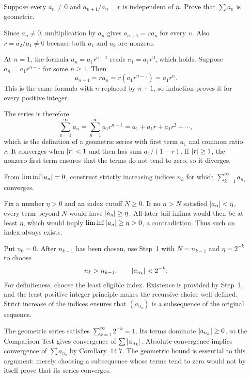 \goal Suppose every $a_n\ne0$ and $a_{n+1}/a_n=r$ is independent
of $n$. Prove that $\sum a_n$ is geometric.

Since $a_n\ne0$, multiplication by $a_n$ gives
$a_{n+1}=ra_n$ for every $n$. Also $r=a_2/a_1\ne0$ because
both $a_1$ and $a_2$ are nonzero.

At $n=1$, the formula $a_n=a_1r^{n-1}$ reads $a_1=a_1r^0$,
which holds. Suppose $a_n=a_1r^{n-1}$ for some $n\ge1$.
Then
\[
 a_{n+1}=ra_n=r(a_1r^{n-1})=a_1r^n.
\]
This is the same formula with $n$ replaced by $n+1$, so induction
proves it for every positive integer.

The series is therefore
\[
 \sum_{n=1}^{\infty}a_n
 =\sum_{n=1}^{\infty}a_1r^{n-1}
 =a_1+a_1r+a_1r^2+\cdots,
\]
which is the definition of a geometric series with first term
$a_1$ and common ratio $r$. It converges when $\left|r\right|<1$ and
then has sum $a_1/(1-r)$. If $\left|r\right|\ge1$, the nonzero first
term ensures that the terms do not tend to zero, so it diverges.

\goal From $\liminf\left|a_n\right|=0$, construct strictly increasing
indices $n_k$ for which $\sum_{k=1}^{\infty}a_{n_k}$ converges.

Fix a number $\eta>0$ and an index cutoff $N\ge0$. If no
$n>N$ satisfied $\left|a_n\right|<\eta$, every term beyond $N$
would have $\left|a_n\right|\ge\eta$. All later tail infima would then
be at least $\eta$, which would imply
$\liminf\left|a_n\right|\ge\eta>0$, a contradiction. Thus such an
index always exists.

Put $n_0=0$. After $n_{k-1}$ has been chosen, use Step~1 with
$N=n_{k-1}$ and $\eta=2^{-k}$ to choose
\[
 n_k>n_{k-1},\qquad\left|a_{n_k}\right|<2^{-k}.
\]
For definiteness, choose the least eligible index. Existence is
provided by Step~1, and the least positive integer principle makes
the recursive choice well defined. Strict increase of the indices
ensures that $(a_{n_k})$ is a subsequence of the original sequence.

The geometric series satisfies $\sum_{k=1}^{\infty}2^{-k}=1$.
Its terms dominate $\left|a_{n_k}\right|\ge0$, so the Comparison Test
gives convergence of $\sum\left|a_{n_k}\right|$. Absolute convergence
implies convergence of $\sum a_{n_k}$ by Corollary~14.7.
The geometric bound is essential to this argument: merely choosing
a subsequence whose terms tend to zero would not by itself prove
that its series converges.

